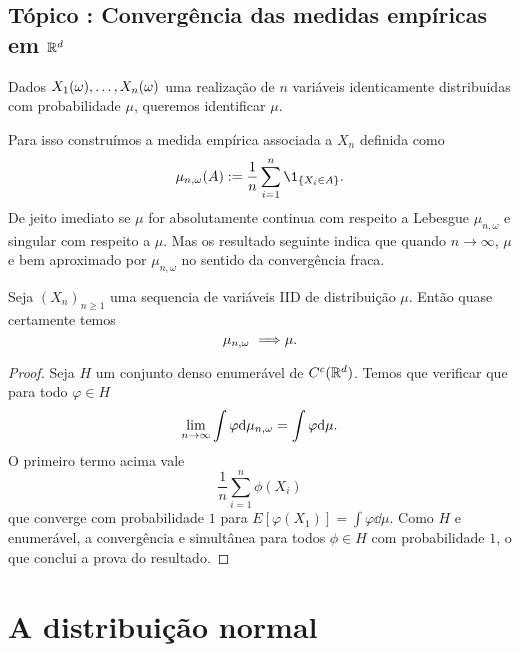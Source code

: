 \begin{topics}
 \section{Tópico : Convergência das medidas empíricas em ${\mathbb R}^d$}


Dados $X_1(\omega),\dots, X_n(\omega)$ uma realização de $n$ variáveis identicamente distribuidas com probabilidade $\mu$, queremos identificar $\mu$.

\medskip

Para isso construímos a medida empírica associada a $X_n$ definida como
\begin{equation}
\mu_{n,\omega}(A):=\frac{1}{n}\sum_{i=1}^n \1_{\{X_i\in A\}}.
\end{equation}
De jeito imediato se $\mu$ for absolutamente continua com respeito a Lebesgue $\mu_{n,\omega}$ e singular com respeito a $\mu$.
Mas os resultado seguinte indica que quando $n\to \infty$, $\mu$ e bem aproximado por $\mu_{n,\omega}$ no sentido da convergência fraca.

\begin{theorem}
 Seja $(X_n)_{n\ge 1}$ uma sequencia de variáveis IID de distribuição $\mu$.
 Então quase certamente temos
 \begin{equation*}
   \mu_{n,\go} \ \Longrightarrow \mu.
 \end{equation*}



\end{theorem}


\begin{proof}
Seja $H$ um conjunto denso enumerável de $C^c({\mathbb R}^d)$.
Temos que verificar que para todo $\varphi\in H$
\begin{equation}
\lim_{n\to \infty} \int \varphi \mathrm{d} \mu_{n,\omega}=  \int \varphi \mathrm{d} \mu.
\end{equation}
O primeiro termo acima vale
$$\frac{1}{n}\sum_{i=1}^n \phi(X_i)$$
que converge com probabilidade $1$ para $E[\varphi(X_1)]= \int \varphi \dd \mu.$
Como $H$ e enumerável, a convergência e simultânea para todos $\phi\in H$ com probabilidade $1$,
o que conclui a prova do resultado.
\end{proof}

\end{topics}

\section{A distribuição normal}

